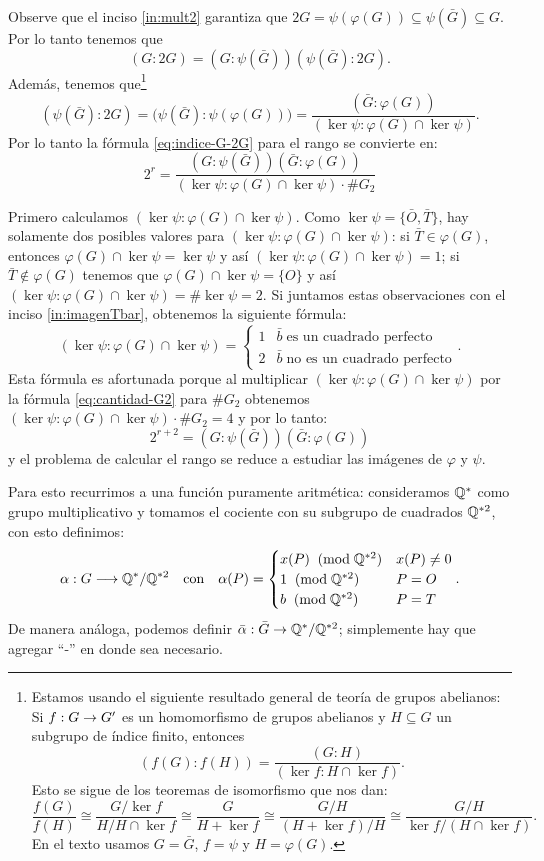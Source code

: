 Observe que el inciso \ref{in:mult2} garantiza que $2G=\psi(\varphi(G))\subseteq\psi(\bar{G})\subseteq G$. Por lo tanto tenemos que
\[
	(G:2G)=(G:\psi(\bar{G}))(\psi(\bar{G}):2G).
\]
Además, tenemos que\footnote{Estamos usando el siguiente resultado general de teoría de grupos abelianos: Si $f:G\rightarrow G'$ es un homomorfismo de grupos abelianos y $H\subseteq G$ un subgrupo de índice finito, entonces
\[
	(f(G):f(H))=\frac{(G:H)}{(\ker f:H\cap\ker f)}.
\]
Esto se sigue de los teoremas de isomorfismo que nos dan:
\[
	\frac{f(G)}{f(H)}\cong\frac{G/\ker f}{H/H\cap\ker f}\cong\frac{G}{H+\ker f}\cong\frac{G/H}{(H+\ker f)/H}\cong\frac{G/H}{\ker f/(H\cap\ker f)}.
\]
En el texto usamos $G=\bar{G}$, $f=\psi$ y $H=\varphi(G)$.}
\[
	(\psi(\bar{G}):2G)=\big(\psi(\bar{G}):\psi(\varphi(G))\big)=\frac{(\bar{G}:\varphi(G))}{(\ker\psi:\varphi(G)\cap\ker\psi)}.
\]
Por lo tanto la fórmula \eqref{eq:indice-G-2G} para el rango se convierte en:
\[
	2^r=\frac{(G:\psi(\bar{G}))(\bar{G}:\varphi(G))}{(\ker\psi:\varphi(G)\cap\ker\psi)\cdot\# G_2}
\]

Primero calculamos $(\ker\psi:\varphi(G)\cap\ker\psi)$. Como $\ker\psi=\{\bar{O},\bar{T}\}$, hay solamente dos posibles valores para $(\ker\psi:\varphi(G)\cap\ker\psi)$: si $\bar{T}\in\varphi(G)$, entonces $\varphi(G)\cap\ker\psi=\ker\psi$ y as\'i $(\ker\psi:\varphi(G)\cap\ker\psi)=1$; si $\bar{T}\not\in\varphi(G)$ tenemos que $\varphi(G)\cap\ker\psi=\{O\}$ y así $(\ker\psi:\varphi(G)\cap\ker\psi)=\#\ker\psi=2$. Si juntamos estas observaciones con el inciso \ref{in:imagenTbar}, obtenemos la siguiente fórmula:
\[
	(\ker\psi:\varphi(G)\cap\ker\psi)=
	\begin{cases}
		1 & \bar{b}\;\text{es un cuadrado perfecto}\\
		2 & \bar{b}\;\text{no es un cuadrado perfecto}
	\end{cases}.
\]
Esta fórmula es afortunada porque al multiplicar $(\ker\psi:\varphi(G)\cap\ker\psi)$ por la fórmula \eqref{eq:cantidad-G2} para $\# G_2$ obtenemos $(\ker\psi:\varphi(G)\cap\ker\psi)\cdot\# G_2=4$ y por lo tanto:
\begin{equation}\label{eq:rango-indices-2}
2^{r+2}=(G:\psi(\bar{G}))(\bar{G}:\varphi(G))
\end{equation}
y el problema de calcular el rango se reduce a estudiar las imágenes de $\varphi$ y $\psi$.

Para esto recurrimos a una función puramente aritmética: consideramos $\mathbb{Q}^*$ como grupo multiplicativo y tomamos el cociente con su subgrupo de cuadrados $\mathbb{Q}^{*2}$, con esto definimos:
\[
	\alpha:G\longrightarrow\mathbb{Q}^*/\mathbb{Q}^{*2}\quad\text{con}\quad \alpha(P)=
	\begin{cases}
		x(P) \;\;(\mathrm{mod}\; \mathbb{Q}^{*2}) & x(P)\neq0\\
		1 \;\;(\mathrm{mod}\; \mathbb{Q}^{*2}) & P=O\\
		b \;\;(\mathrm{mod}\; \mathbb{Q}^{*2}) & P=T
	\end{cases}.
\]
De manera análoga, podemos definir $\bar{\alpha}:\bar{G}\rightarrow\mathbb{Q}^*/\mathbb{Q}^{*2}$; simplemente hay que agregar ``-'' en donde sea necesario.

